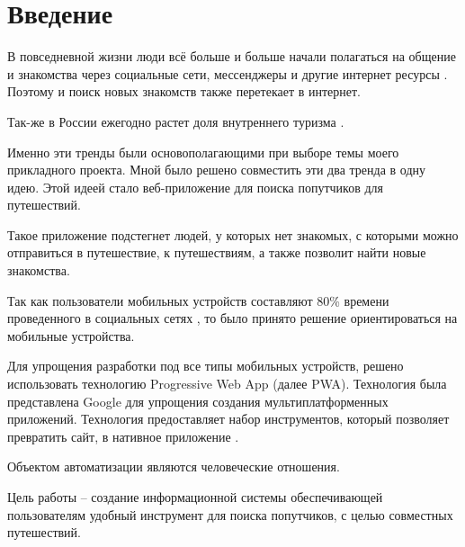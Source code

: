 \section*{Введение}

В повседневной жизни люди всё больше и больше начали полагаться на общение и знакомства через социальные сети, мессенджеры и другие интернет ресурсы \cite{social-media-users}. Поэтому и поиск новых знакомств также перетекает в интернет.

Так-же в России ежегодно растет доля внутреннего туризма \cite{vnut-turism}.

Именно эти тренды были основополагающими при выборе темы моего прикладного проекта. Мной было решено совместить эти два тренда в одну идею. Этой идеей стало веб-приложение для поиска попутчиков для путешествий.

Такое приложение подстегнет людей, у которых нет знакомых, с которыми можно отправиться в путешествие, к путешествиям, а также позволит найти новые знакомства.

Так как пользователи мобильных устройств составляют 80\% времени проведенного в социальных сетях \cite{mobile-vs-desktop-usage}, то было принято решение ориентироваться на мобильные устройства.

Для упрощения разработки под все типы мобильных устройств, решено использовать технологию Progressive Web App (далее PWA). Технология была представлена Google для упрощения создания мультиплатформенных приложений. Технология предоставляет набор инструментов, который позволяет превратить сайт, в нативное приложение \cite{what-are-pwas}.

Объектом автоматизации являются человеческие отношения.

Цель работы – создание информационной системы обеспечивающей пользователям удобный инструмент для поиска попутчиков, с целью совместных путешествий.
